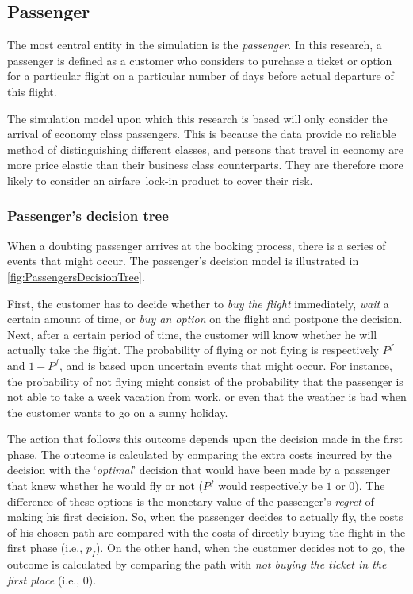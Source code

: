 \subsection{Passenger}
\label{sec:Passenger}
The most central entity in the simulation is the \emph{passenger}.  In this research, a passenger is defined as a customer who considers to purchase a ticket or option for a particular flight on a particular number of days before actual departure of this flight. 

The simulation model upon which this research is based will only consider the arrival of economy class passengers. This is because the data provide no reliable method of distinguishing different classes, and persons that travel in economy are more price elastic than their business class counterparts. They are therefore more likely to consider an airfare~lock-in product to cover their risk.

\subsubsection{Passenger's decision tree}
When a doubting passenger arrives at the booking process, there is a series of events that might occur. The passenger's decision model is illustrated in \autoref{fig:PassengersDecisionTree}.


First, the customer has to decide whether to \emph{buy the flight} immediately, \emph{wait} a certain amount of time, or \emph{buy an option} on the flight and postpone the decision. Next, after a certain period of time, the customer will know whether he will actually take the flight. The probability of flying or not flying is respectively $P^f$ and $1 - P^f$, and is based upon uncertain events that might occur. For instance, the probability of not flying might consist of the probability that the passenger is not able to take a week vacation from work, or even that the weather is bad when the customer wants to go on a sunny holiday.

The action that follows this outcome depends upon the decision made in the first phase. The outcome is calculated by comparing the extra costs incurred by the decision with the `\emph{optimal}' decision that would have been made by a passenger that knew whether he would fly or not ($P^f$ would respectively be $1$ or $0$). The difference of these options is the monetary value of the passenger's \emph{regret} of making his first decision. So, when the passenger decides to actually fly, the costs of his chosen path are compared with the costs of directly buying the flight in the first phase (i.e., $p_I$). On the other hand, when the customer decides not to go, the outcome is calculated by comparing the path with \emph{not buying the ticket in the first place} (i.e., $0$).

